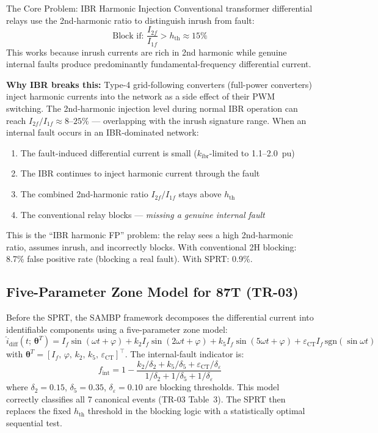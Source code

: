 \documentclass[12pt,a4paper]{article}
\newcommand{\kibr}{k_\mathrm{ibr}}
\begin{document}
\begin{warnbox}{The Core Problem: IBR Harmonic Injection}
Conventional transformer differential relays use the 2nd-harmonic ratio to distinguish inrush from fault:
\[
  \text{Block if: } \frac{I_{2f}}{I_{1f}} > h_\mathrm{th} \approx 15\%
\]
This works because inrush currents are rich in 2nd harmonic while genuine internal faults produce predominantly fundamental-frequency differential current.

\textbf{Why IBR breaks this:} Type-4 grid-following converters (full-power converters) inject harmonic currents into the network as a side effect of their PWM switching. The 2nd-harmonic injection level during normal IBR operation can reach $I_{2f}/I_{1f} \approx 8$--$25\%$ --- overlapping with the inrush signature range. When an internal fault occurs in an IBR-dominated network:
\begin{enumerate}[nosep]
  \item The fault-induced differential current is small ($\kibr$-limited to 1.1--2.0~pu)
  \item The IBR continues to inject harmonic current through the fault
  \item The combined 2nd-harmonic ratio $I_{2f}/I_{1f}$ stays above $h_\mathrm{th}$
  \item The conventional relay blocks --- \textit{missing a genuine internal fault}
\end{enumerate}

This is the ``IBR harmonic FP'' problem: the relay sees a high 2nd-harmonic ratio, assumes inrush, and incorrectly blocks. With conventional 2H blocking: 8.7\% false positive rate (blocking a real fault). With SPRT: 0.9\%.
\end{warnbox}

\subsection{Five-Parameter Zone Model for 87T (TR-03)}

Before the SPRT, the SAMBP framework decomposes the differential current into identifiable components using a five-parameter zone model:
\[
  \hat{i}_\mathrm{diff}(t;\,\bm{\theta}^T) = I_f\sin(\omega t+\varphi)
  + k_2 I_f \sin(2\omega t+\varphi)
  + k_5 I_f \sin(5\omega t+\varphi)
  + \varepsilon_\mathrm{CT} I_f\,\mathrm{sgn}(\sin\omega t)
\]
with $\bm{\theta}^T = [I_f,\,\varphi,\,k_2,\,k_5,\,\varepsilon_\mathrm{CT}]^\intercal$. The internal-fault indicator is:
\[
  f_\mathrm{int} = 1 - \frac{k_2/\delta_2 + k_5/\delta_5 + \varepsilon_\mathrm{CT}/\delta_\varepsilon}{1/\delta_2 + 1/\delta_5 + 1/\delta_\varepsilon}
\]
where $\delta_2=0.15$, $\delta_5=0.35$, $\delta_\varepsilon=0.10$ are blocking thresholds. This model correctly classifies all 7 canonical events (TR-03 Table~3). The SPRT then replaces the fixed $h_\mathrm{th}$ threshold in the blocking logic with a statistically optimal sequential test.
\end{document}
